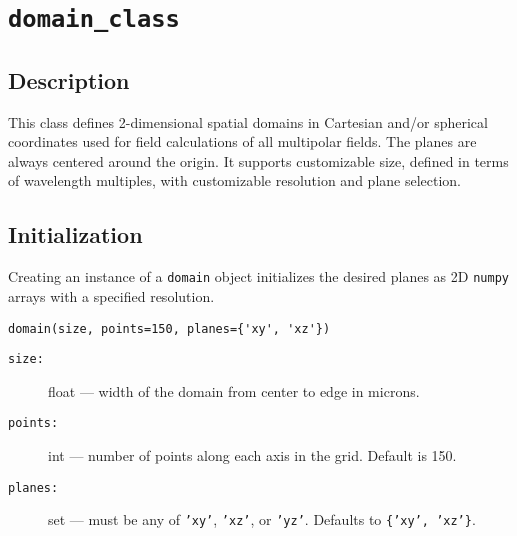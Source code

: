 \section{\texttt{domain\_class}}

\subsection{Description}
This class defines 2-dimensional spatial domains in Cartesian and/or spherical coordinates used for field calculations of all multipolar fields. The planes are always centered around the origin. It supports customizable size, defined in terms of wavelength multiples, with customizable resolution and plane selection.

\subsection{Initialization}
Creating an instance of a \texttt{domain} object initializes the desired planes as 2D \texttt{numpy} arrays with a specified resolution.

\begin{verbatim}
domain(size, points=150, planes={'xy', 'xz'})
\end{verbatim}

\begin{description}
    \item[\texttt{size:}] float — width of the domain from center to edge in microns.
    \item[\texttt{points:}] int — number of points along each axis in the grid. Default is 150.
    \item[\texttt{planes:}] set — must be any of \texttt{'xy'}, \texttt{'xz'}, or \texttt{'yz'}. Defaults to \texttt{\{'xy', 'xz'\}}.
\end{description}

